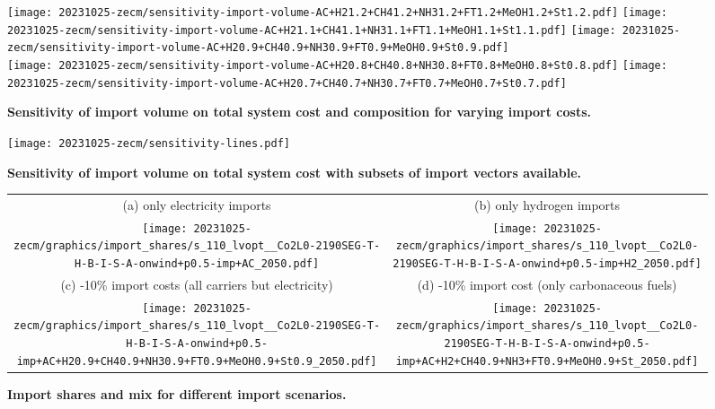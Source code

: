 \begin{figure*}
    \texttt{[image: 20231025-zecm/sensitivity-import-volume-AC+H21.2+CH41.2+NH31.2+FT1.2+MeOH1.2+St1.2.pdf]}
    \texttt{[image: 20231025-zecm/sensitivity-import-volume-AC+H21.1+CH41.1+NH31.1+FT1.1+MeOH1.1+St1.1.pdf]}
    \texttt{[image: 20231025-zecm/sensitivity-import-volume-AC+H20.9+CH40.9+NH30.9+FT0.9+MeOH0.9+St0.9.pdf]} \\
    \texttt{[image: 20231025-zecm/sensitivity-import-volume-AC+H20.8+CH40.8+NH30.8+FT0.8+MeOH0.8+St0.8.pdf]}
    \texttt{[image: 20231025-zecm/sensitivity-import-volume-AC+H20.7+CH40.7+NH30.7+FT0.7+MeOH0.7+St0.7.pdf]}
    \caption{\textbf{Sensitivity of import volume on total system cost and composition for varying import costs.}}
    \label{fig:si:volume}
\end{figure*}



\begin{figure*}
    \texttt{[image: 20231025-zecm/sensitivity-lines.pdf]}
    \caption{\textbf{Sensitivity of import volume on total system cost with subsets of import vectors available.}}
    \label{fig:si:volume-subsets}
\end{figure*}



\begin{figure*}
    \footnotesize
    \begin{tabular}{cc}
        (a) only electricity imports & (b) only hydrogen imports \\
        \texttt{[image: 20231025-zecm/graphics/import\_shares/s\_110\_lvopt\_\_Co2L0-2190SEG-T-H-B-I-S-A-onwind+p0.5-imp+AC\_2050.pdf]} &
        \texttt{[image: 20231025-zecm/graphics/import\_shares/s\_110\_lvopt\_\_Co2L0-2190SEG-T-H-B-I-S-A-onwind+p0.5-imp+H2\_2050.pdf]} \\
        (c) -10\% import costs (all carriers but electricity) & (d) -10\% import cost (only carbonaceous fuels) \\
        \texttt{[image: 20231025-zecm/graphics/import\_shares/s\_110\_lvopt\_\_Co2L0-2190SEG-T-H-B-I-S-A-onwind+p0.5-imp+AC+H20.9+CH40.9+NH30.9+FT0.9+MeOH0.9+St0.9\_2050.pdf]} &
        \texttt{[image: 20231025-zecm/graphics/import\_shares/s\_110\_lvopt\_\_Co2L0-2190SEG-T-H-B-I-S-A-onwind+p0.5-imp+AC+H2+CH40.9+NH3+FT0.9+MeOH0.9+St\_2050.pdf]} \\
    \end{tabular}
    \caption{\textbf{Import shares and mix for different import scenarios.}}
    \label{fig:si:import-shares}
\end{figure*}

